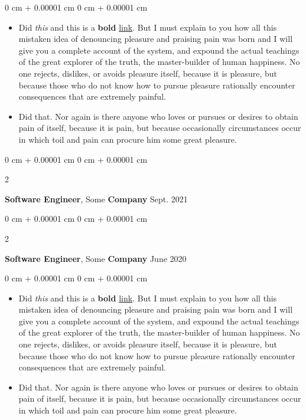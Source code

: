 \documentclass[10pt, letterpaper]{article}
\newenvironment{highlights}{
    \begin{itemize}[
        topsep=0.10 cm,
        parsep=0.10 cm,
        partopsep=0pt,
        itemsep=0pt,
        leftmargin=0 cm + 10pt
    ]
}{
    \end{itemize}
} %
\newenvironment{onecolentry}{
    \begin{adjustwidth}{
        0 cm + 0.00001 cm
    }{
        0 cm + 0.00001 cm
    }
}{
    \end{adjustwidth}
} %
\newenvironment{twocolentry}[2][]{
    \onecolentry
    \def\secondColumn{#2}
    \setcolumnwidth{\fill, 4.5 cm}
    \begin{paracol}{2}
}{
    \switchcolumn \raggedleft \secondColumn
    \end{paracol}
    \endonecolentry
} %
\begin{document}
        \vspace{0.10 cm}
        \begin{onecolentry}
            \begin{highlights}
                \item Did \textit{this} and this is a \textbf{bold} \href{https://example.com}{link}. But I must explain to you how all this mistaken idea of denouncing pleasure and praising pain was born and I will give you a complete account of the system, and expound the actual teachings of the great explorer of the truth, the master-builder of human happiness. No one rejects, dislikes, or avoids pleasure itself, because it is pleasure, but because those who do not know how to pursue pleasure rationally encounter consequences that are extremely painful.
                \item Did that. Nor again is there anyone who loves or pursues or desires to obtain pain of itself, because it is pain, but because occasionally circumstances occur in which toil and pain can procure him some great pleasure.
            \end{highlights}
        \end{onecolentry}


        \vspace{0.2 cm}

        \begin{twocolentry}{
            Sept. 2021
        }
            \textbf{Software Engineer}, Some \textbf{Company}\end{twocolentry}



        \vspace{0.2 cm}

        \begin{twocolentry}{
            June 2020
        }
            \textbf{Software Engineer}, Some \textbf{Company}\end{twocolentry}

        \vspace{0.10 cm}
        \begin{onecolentry}
            \begin{highlights}
                \item Did \textit{this} and this is a \textbf{bold} \href{https://example.com}{link}. But I must explain to you how all this mistaken idea of denouncing pleasure and praising pain was born and I will give you a complete account of the system, and expound the actual teachings of the great explorer of the truth, the master-builder of human happiness. No one rejects, dislikes, or avoids pleasure itself, because it is pleasure, but because those who do not know how to pursue pleasure rationally encounter consequences that are extremely painful.
                \item Did that. Nor again is there anyone who loves or pursues or desires to obtain pain of itself, because it is pain, but because occasionally circumstances occur in which toil and pain can procure him some great pleasure.
            \end{highlights}
        \end{onecolentry}
\end{document}
